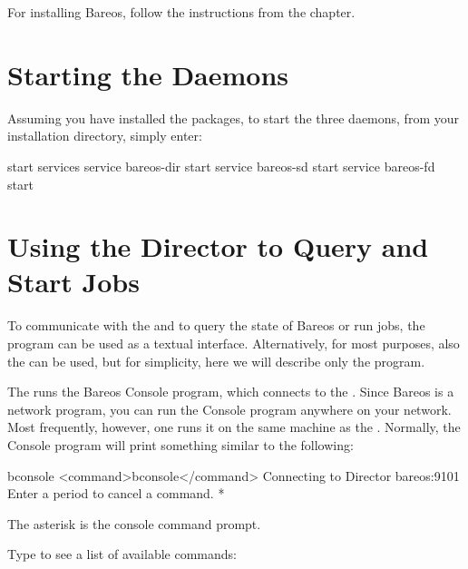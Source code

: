 For installing Bareos, follow the instructions from the  chapter.

\section{Starting the Daemons}
\label{StartDaemon}

Assuming you have installed the packages,
to start the three daemons, from your installation directory, simply enter:

\begin{bconsole}{start services}
service bareos-dir start
service bareos-sd start
service bareos-fd start
\end{bconsole}

\section{Using the Director to Query and Start Jobs}

\label{sec:TuturialBconsole}

To communicate with the \bareosDir and to query the state of Bareos or run jobs,
the  program can be used as a textual interface.
Alternatively, for most purposes, also the  can be used,
but for simplicity, here we will describe only the  program.

The  runs the Bareos Console program, which connects to the
\bareosDir. Since Bareos is a network program, you can run the Console
program anywhere on your network. Most frequently, however, one runs it on the
same machine as the \bareosDir. Normally, the Console program will print
something similar to the following:

\begin{commands}{bconsole}
<command>bconsole</command>
Connecting to Director bareos:9101
Enter a period to cancel a command.
*
\end{commands}

The asterisk is the console command prompt.

Type  to see a list of available commands:

